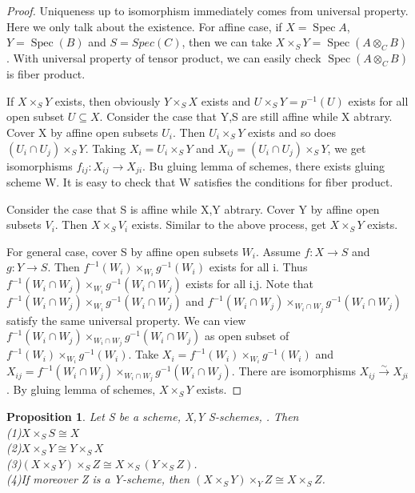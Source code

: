 \documentclass{ctexart}
\newtheorem{proposition}{Proposition}[section]
\newcommand{\spec}{\operatorname{Spec}}
\begin{document}
\begin{proof}
    Uniqueness up to isomorphism immediately comes from universal property.
    Here we only talk about the existence.
    For affine case, if $X = \spec A$, $Y = \spec(B)$ and $S =Spec(C)$, then we can take $X \times_{S} Y = \spec(A \otimes_{C} B)$.
    With universal property of tensor product, we can easily check $\spec(A \otimes_{C} B)$ is fiber product.
    \par
    If $X \times_{S} Y$ exists, then obviously $Y \times_{S} X$ exists and $U \times_{S} Y = p^{-1}(U)$ exists for all open subset $U \subseteq X$.
    Consider the case that Y,S are still affine while X abtrary.
    Cover X by affine open subsets $U_{i}$.
    Then $U_{i} \times_{S} Y$ exists and so does $(U_{i} \cap U_{j}) \times_{S} Y$.
    Taking $X_{i} = U_{i} \times_{S} Y$ and $X_{ij} = (U_{i} \cap U_{j}) \times_{S} Y$, we get isomorphisms $f_{ij}: X_{ij} \longrightarrow X_{ji}$.
    Bu gluing lemma of schemes, there exists gluing scheme W.
    It is easy to check that W satisfies the conditions for fiber product.
    \par
    Consider the case that S is affine while X,Y abtrary.
    Cover Y by affine open subsets $V_{i}$.
    Then $X \times_{S} V_{i}$ exists.
    Similar to the above process, get $X \times_{S} Y$ exists.
    \par
    For general case, cover S by affine open subsets $W_{i}$.
    Assume $f: X \longrightarrow S$ and $g: Y \longrightarrow S$.
    Then $f^{-1}(W_{i}) \times_{W_{i}} g^{-1}(W_{i})$ exists for all i.
    Thus $f^{-1}(W_{i} \cap W_{j}) \times_{W_{i}} g^{-1}(W_{i} \cap W_{j})$ exists for all i,j.
    Note that $f^{-1}(W_{i} \cap W_{j}) \times_{W_{i}} g^{-1}(W_{i} \cap W_{j})$ and $f^{-1}(W_{i} \cap W_{j}) \times_{W_{i} \cap W_{j}} g^{-1}(W_{i} \cap W_{j})$ satisfy the same universal property.
    We can view $f^{-1}(W_{i} \cap W_{j}) \times_{W_{i} \cap W_{j}} g^{-1}(W_{i} \cap W_{j})$ as open subset of $f^{-1}(W_{i}) \times_{W_{i}} g^{-1}(W_{i})$.
    Take $X_{i} = f^{-1}(W_{i}) \times_{W_{i}} g^{-1}(W_{i})$ and $X_{ij} = f^{-1}(W_{i} \cap W_{j}) \times_{W_{i} \cap W_{j}} g^{-1}(W_{i} \cap W_{j})$.
    There are isomorphisms $X_{ij} \overset{\sim}{\longrightarrow} X_{ji}$.
    By gluing lemma of schemes, $X \times_{S} Y$ exists.
\end{proof}
\begin{proposition}
    Let S be a scheme, X,Y S-schemes, .
    Then \\
    (1)$X \times_{S} S \cong X$ \\
    (2)$X \times_{S} Y \cong Y \times_{S} X$ \\
    (3)$(X \times_{S} Y) \times_{S} Z \cong X \times_{S} (Y \times_{S} Z)$. \\
    (4)If moreover Z is a Y-scheme, then $(X \times_{S} Y) \times_{Y} Z \cong X \times_{S} Z$. 
    \label{Proposition 2.8}
\end{proposition}
\end{document}
